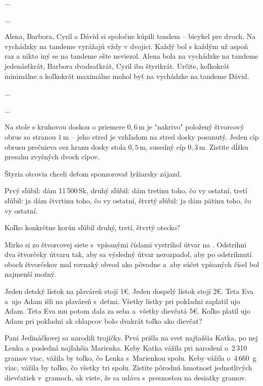 {%
...}

{%
...}

{%
Alena, Barbora, Cyril a Dávid si spoločne kúpili tandem -- bicykel pre dvoch. Na
vychádzky na tandeme vyrážajú vždy v dvojici. Každý bol s každým už aspoň raz a
nikto iný se na tandeme ešte neviezol. Alena bola na vychádzke na tandeme
jedenásťkrát, Barbora dvadsaťkrát, Cyril iba štyrikrát. Určite, koľkokrát minimálne a
koľkokrát maximálne mohol byť na vychádzke na tandeme Dávid.}

{%
...}

{%
...}

{%
Na stole s kruhovou doskou o priemere $0{,}6\,\text{m}$ je "nakrivo" položený štvorcový obrus
so stranou $1\,\text{m}$ -- jeho stred je vzhľadom na stred dosky posunutý. Jeden cíp obrusu
prečnieva cez hranu dosky stola $0{,}5\,\text{m}$, susedný cíp $0{,}3\,\text{m}$. Zistite dĺžku presahu
zvyšných dvoch cípov.}

{%
Štyria otcovia chceli deťom sponzorovať lyžiarsky zájazd.
\begin{itemize}
\itemvar{} Prvý sľúbil: dám 11\,500\,Sk,
\itemvar{} druhý sľúbil: dám tretinu toho, čo vy ostatní,
\itemvar{} tretí sľúbil: ja dám štvrtinu toho, čo vy ostatní,
\itemvar{} štvrtý sľúbil: ja dám pätinu toho, čo vy ostatní.
\end{itemize}
\noindent
Koľko konkrétne korún sľúbil druhý, tretí, štvrtý otecko?}

{%
Mirko si zo štvorcovej siete s~vpísanými číslami vystrihol útvar na \obr.
Odstrihni dva štvorčeky útvaru tak, aby sa výsledný
útvar nerozpadol, aby po odstrihnutí oboch
štvorčekov mal rovnaký obvod ako pôvodne a~aby
súčet vpísaných čísel bol najmenší možný.
%
}

{%
Jeden detský lístok na plaváreň stojí 1€. Jeden dospelý lístok stojí 2€. Teta
Eva a~ujo Adam išli na plaváreň s~deťmi. Všetky lístky pri pokladni zaplatil ujo
Adam. Teta Eva mu potom dala za seba a~všetky dievčatá 5€. Koľko platil ujo
Adam pri pokladni ak chlapcov bolo dvakrát toľko ako dievčat?}

{%
Pani Jedináčkovej sa narodili trojičky. Prvá prišla na svet najťažšia Katka, po
nej Lenka a posledná najľahšia Marienka. Keby Katka vážila pri narodení
o~2\,310 gramov viac, vážila by toľko, čo Lenka s~Marienkou spolu. Keby vážila
o~4\,660~g viac, vážila by toľko, čo všetky tri spolu. Zistite pôrodnú hmotnosť
jednotlivých dievčatiek v~gramoch, ak viete, že sa udáva s~presnosťou na
desiatky gramov.}

